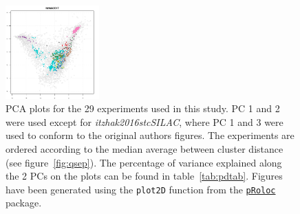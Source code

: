 \documentclass[12pt]{article}\usepackage[]{graphicx}\usepackage[]{color}
\newcommand{\Rpackage}[1]{\texttt{#1}}
\newcommand\Biocpkg[1]{%
  {\href{http://bioconductor.org/packages/#1}%
    {\Rpackage{#1}}}}
\begin{document}
\begin{appendices}
\begin{figure}[htb]
  \includegraphics[width = 0.32\textwidth]{./figure/figpca-28.pdf}
\caption{PCA plots for the 29 experiments used in
  this study. PC 1 and 2 were used except for
  \textit{itzhak2016stcSILAC}, where PC 1 and 3 were used to conform to
  the original authors figures. The experiments are ordered according
  to the median average between cluster distance (see
  figure~\ref{fig:qsep}). The percentage of variance explained along
  the 2 PCs on the plots can be found in
  table~\ref{tab:pdtab}. Figures have been generated using the
  \texttt{plot2D} function from the \Biocpkg{pRoloc} package.}
  \label{fig:pca}
\end{figure}


\end{appendices}
\end{document}
